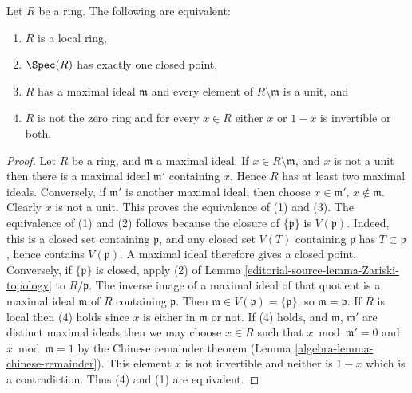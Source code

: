 \begin{lemma}
\label{editorial-source-lemma-characterize-local-ring}
Let $R$ be a ring. The following are equivalent:
\begin{enumerate}
\item $R$ is a local ring,
\item $\Spec(R)$ has exactly one closed point,
\item $R$ has a maximal ideal $\mathfrak m$
and every element of $R \setminus \mathfrak m$
is a unit, and
\item $R$ is not the zero ring and for every $x \in R$ either $x$
or $1 - x$ is invertible or both.
\end{enumerate}
\end{lemma}

\begin{proof}
Let $R$ be a ring, and $\mathfrak m$ a maximal ideal.
If $x \in R \setminus \mathfrak m$, and $x$ is not a unit
then there is a maximal ideal $\mathfrak m'$ containing $x$.
Hence $R$ has at least two maximal ideals. Conversely,
if $\mathfrak m'$ is another maximal ideal, then choose
$x \in \mathfrak m'$, $x \not \in \mathfrak m$. Clearly
$x$ is not a unit. This proves the equivalence of (1) and (3).
The equivalence of (1) and (2) follows because the closure of $\{\mathfrak p\}$ is
$V(\mathfrak p)$. Indeed, this is a closed set containing
$\mathfrak p$, and any closed set $V(T)$ containing $\mathfrak p$
has $T\subset\mathfrak p$, hence contains $V(\mathfrak p)$.
A maximal ideal therefore gives a closed point. Conversely, if
$\{\mathfrak p\}$ is closed, apply (2) of
Lemma \ref{editorial-source-lemma-Zariski-topology} to $R/\mathfrak p$.
The inverse image of a maximal ideal of that quotient is a maximal
ideal $\mathfrak m$ of $R$ containing $\mathfrak p$.
Then $\mathfrak m\in V(\mathfrak p)=\{\mathfrak p\}$,
so $\mathfrak m=\mathfrak p$.
If $R$ is local then (4) holds since $x$ is either in $\mathfrak m$
or not. If (4) holds, and $\mathfrak m$, $\mathfrak m'$ are distinct
maximal ideals then we may choose $x \in R$ such that
$x \bmod \mathfrak m' = 0$ and $x \bmod \mathfrak m = 1$
by the Chinese remainder theorem
(Lemma \ref{algebra-lemma-chinese-remainder}).
This element $x$ is not invertible and neither is $1 - x$ which is
a contradiction. Thus (4) and (1) are equivalent.
\end{proof}